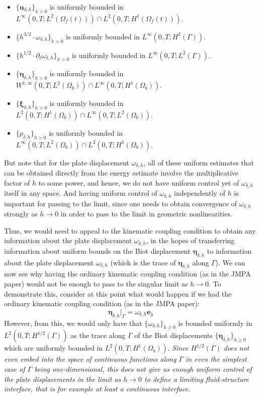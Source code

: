 \documentclass[11pt]{article}
\newcommand{\bd}{\boldsymbol}
\theoremstyle{definition}
\begin{document}
\begin{itemize}
\item $\{\bd{u}_{\delta, h}\}_{h > 0}$ is uniformly bounded in $L^{\infty}(0, T; L^{2}(\Omega_{f}(t))) \cap L^{2}(0, T; H^{1}(\Omega_{f}(t)))$.
\item $\{h^{3/2} \cdot \omega_{\delta, h}\}_{h > 0}$ is uniformly bounded in $L^{\infty}(0, T; H^{2}(\Gamma))$.
\item $\{h^{1/2} \cdot \partial_{t}\omega_{\delta, h}\}_{h > 0}$ is uniformly bounded in $L^{\infty}(0, T; L^{2}(\Gamma))$. 
\item $\{\bd{\eta}_{\delta, h}\}_{h > 0}$ is uniformly bounded in $W^{1, \infty}(0, T; L^{2}(\Omega_{b})) \cap L^{\infty}(0, T; H^{1}(\Omega_{b}))$.
\item $\{\bd{\xi}_{\delta, h}\}_{h > 0}$ is uniformly bounded in $L^{2}(0, T; H^{1}(\Omega_{b})) \cap L^{\infty}(0, T; L^{2}(\Omega_{b}))$. 
\item $\{p_{\delta, h}\}_{h > 0}$ is uniformly bounded in $L^{\infty}(0, T; L^{2}(\Omega_{b})) \cap L^{2}(0, T; H^{1}(\Omega_{b}))$.
\end{itemize}
But note that for the plate displacement $\omega_{\delta, h}$, all of these uniform estimates that can be obtained directly from the energy estimate involve the multiplicative factor of $h$ to some power, and hence, we do not have uniform control yet of $\omega_{\delta, h}$ itself in any space. And having uniform control of $\omega_{\delta, h}$ independently of $h$ is important for passing to the limit, since one needs to obtain convergence of $\omega_{\delta, h}$ strongly as $h \to 0$ in order to pass to the limit in geometric nonlinearities.

Thus, we would need to appeal to the kinematic coupling condition to obtain any information about the plate displacement $\omega_{\delta, h}$, in the hopes of transferring information about uniform bounds on the Biot displacement $\bd{\eta}_{\delta, h}$ to information about the plate displacement $\omega_{\delta, h}$ (which is the trace of $\bd{\eta}_{\delta, h}$ along $\Gamma$). We can now see why having the ordinary kinematic coupling condition (as in the JMPA paper) would not be enough to pass to the singular limit as $h \to 0$. To demonstrate this, consider at this point what would happen if we had the ordinary kinematic coupling condition (as in the JMPA paper):
\begin{equation*}
\bd{\eta}_{\delta, h}|_{\Gamma} = \omega_{\delta, h} \bd{e}_{y}
\end{equation*}
However, from this, we would only have that $\{\omega_{\delta, h}\}_{h \ge 0}$ is bounded uniformly in $L^{2}(0, T; H^{1/2}(\Gamma))$ as the trace along $\Gamma$ of the Biot displacements $\{\bd{\eta}_{\delta, h}\}_{h \ge 0}$ which are uniformly bounded in $L^{2}(0, T; H^{1}(\Omega_{b}))$. \textit{Since $H^{1/2}(\Gamma)$ does not even embed into the space of continuous functions along $\Gamma$ in even the simplest case of $\Gamma$ being one-dimensional, this does not give us enough uniform control of the plate displacements in the limit as $h \to 0$ to define a limiting fluid-structure interface, that is for example at least a continuous interface.}
\end{document}
